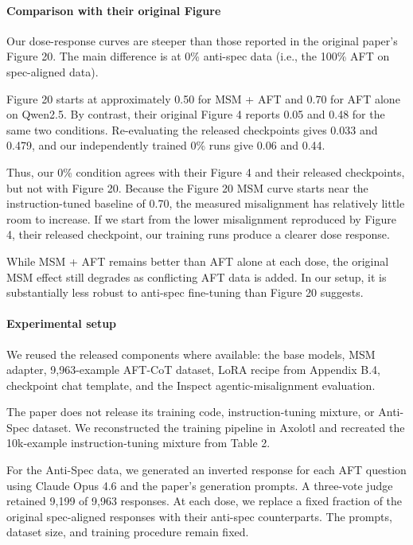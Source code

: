 \paragraph{Comparison with their original Figure}
Our dose-response curves are steeper than those reported in the original paper’s Figure 20. The main difference is at 0\% anti-spec data (i.e., the 100\% AFT on spec-aligned data).

Figure 20 starts at approximately 0.50 for MSM + AFT and 0.70 for AFT alone on Qwen2.5. By contrast, their original Figure 4 reports 0.05 and 0.48 for the same two conditions. Re-evaluating the released checkpoints gives 0.033 and 0.479, and our independently trained 0\% runs give 0.06 and 0.44.

Thus, our 0\% condition agrees with their Figure 4 and their released checkpoints, but not with Figure 20. Because the Figure 20 MSM curve starts near the instruction-tuned baseline of 0.70, the measured misalignment has relatively little room to increase. If we start from the lower misalignment reproduced by Figure 4, their released checkpoint, our training runs produce a clearer dose response.

While MSM + AFT remains better than AFT alone at each dose, the original MSM effect still degrades as conflicting AFT data is added. In our setup, it is substantially less robust to anti-spec fine-tuning than Figure 20 suggests.

\paragraph{Experimental setup}
We reused the released components where available: the base models, MSM adapter, 9,963-example AFT-CoT dataset, LoRA recipe from Appendix B.4, checkpoint chat template, and the Inspect agentic-misalignment evaluation.

The paper does not release its training code, instruction-tuning mixture, or Anti-Spec dataset. We reconstructed the training pipeline in Axolotl and recreated the 10k-example instruction-tuning mixture from Table 2.

For the Anti-Spec data, we generated an inverted response for each AFT question using Claude Opus 4.6 and the paper’s generation prompts. A three-vote judge retained 9,199 of 9,963 responses. At each dose, we replace a fixed fraction of the original spec-aligned responses with their anti-spec counterparts. The prompts, dataset size, and training procedure remain fixed.

